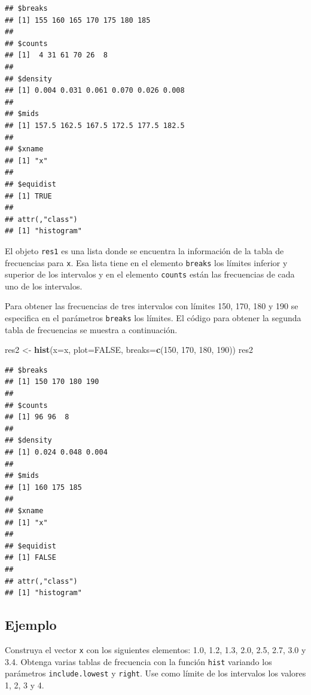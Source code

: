 \documentclass[10pt,]{krantz}
\makeatletter
\newenvironment{Shaded}{\begin{snugshade}}{\end{snugshade}}
\newcommand{\KeywordTok}[1]{\textcolor[rgb]{0.13,0.29,0.53}{\textbf{#1}}}
\newcommand{\DataTypeTok}[1]{\textcolor[rgb]{0.13,0.29,0.53}{#1}}
\newcommand{\DecValTok}[1]{\textcolor[rgb]{0.00,0.00,0.81}{#1}}
\newcommand{\StringTok}[1]{\textcolor[rgb]{0.31,0.60,0.02}{#1}}
\newcommand{\OtherTok}[1]{\textcolor[rgb]{0.56,0.35,0.01}{#1}}
\newcommand{\NormalTok}[1]{#1}
\newenvironment{kframe}{%
\medskip{}
\setlength{\fboxsep}{.8em}
 \def\at@end@of@kframe{}%
 \ifinner\ifhmode%
  \def\at@end@of@kframe{\end{minipage}}%
  \begin{minipage}{\columnwidth}%
 \fi\fi%
 \def\FrameCommand##1{\hskip\@totalleftmargin \hskip-\fboxsep
 \colorbox{shadecolor}{##1}\hskip-\fboxsep
     \hskip-\linewidth \hskip-\@totalleftmargin \hskip\columnwidth}%
 \MakeFramed {\advance\hsize-\width
   \@totalleftmargin\z@ \linewidth\hsize
   \@setminipage}}%
 {\par\unskip\endMakeFramed%
 \at@end@of@kframe}
\renewenvironment{Shaded}{\begin{kframe}}{\end{kframe}}
\makeatother
\begin{document}
\begin{verbatim}
## $breaks
## [1] 155 160 165 170 175 180 185
## 
## $counts
## [1]  4 31 61 70 26  8
## 
## $density
## [1] 0.004 0.031 0.061 0.070 0.026 0.008
## 
## $mids
## [1] 157.5 162.5 167.5 172.5 177.5 182.5
## 
## $xname
## [1] "x"
## 
## $equidist
## [1] TRUE
## 
## attr(,"class")
## [1] "histogram"
\end{verbatim}

El objeto \texttt{res1} es una lista donde se encuentra la información
de la tabla de frecuencias para \texttt{x}. Esa lista tiene en el
elemento \texttt{breaks} los límites inferior y superior de los
intervalos y en el elemento \texttt{counts} están las frecuencias de
cada uno de los intervalos.

Para obtener las frecuencias de tres intervalos con límites 150, 170,
180 y 190 se especifica en el parámetros \texttt{breaks} los límites. El
código para obtener la segunda tabla de frecuencias se muestra a
continuación.

\begin{Shaded}
\begin{Highlighting}[]
\NormalTok{res2 <-}\StringTok{ }\KeywordTok{hist}\NormalTok{(}\DataTypeTok{x=}\NormalTok{x, }\DataTypeTok{plot=}\OtherTok{FALSE}\NormalTok{, }
             \DataTypeTok{breaks=}\KeywordTok{c}\NormalTok{(}\DecValTok{150}\NormalTok{, }\DecValTok{170}\NormalTok{, }\DecValTok{180}\NormalTok{, }\DecValTok{190}\NormalTok{))}
\NormalTok{res2}
\end{Highlighting}
\end{Shaded}

\begin{verbatim}
## $breaks
## [1] 150 170 180 190
## 
## $counts
## [1] 96 96  8
## 
## $density
## [1] 0.024 0.048 0.004
## 
## $mids
## [1] 160 175 185
## 
## $xname
## [1] "x"
## 
## $equidist
## [1] FALSE
## 
## attr(,"class")
## [1] "histogram"
\end{verbatim}

\subsection*{Ejemplo}\label{ejemplo-29}


Construya el vector \texttt{x} con los siguientes elementos: 1.0, 1.2,
1.3, 2.0, 2.5, 2.7, 3.0 y 3.4. Obtenga varias tablas de frecuencia con
la función \texttt{hist} variando los parámetros \texttt{include.lowest}
y \texttt{right}. Use como límite de los intervalos los valores 1, 2, 3
y 4.
\end{document}
